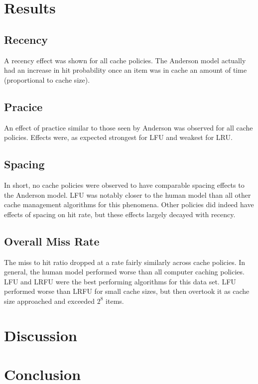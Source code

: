 \documentclass[10pt,letterpaper]{article}
\begin{document}
\section{Results}

\subsection{Recency}

A recency effect was shown for all cache policies. The Anderson model actually had an
increase in hit probability once an item was in cache an amount of time (proportional to cache size).

\subsection{Pracice}

An effect of practice similar to those seen by Anderson was observed for all cache policies.
Effects were, as expected strongest for LFU and weakest for LRU.

\subsection{Spacing}

In short, no cache policies were observed to have comparable spacing effects to the Anderson model. 
LFU was notably closer to the human model than all other cache management algorithms for this phenomena.
Other policies did indeed have effects of spacing on hit rate, but these effects largely decayed with recency.


\subsection{Overall Miss Rate}

The miss to hit ratio dropped at a rate fairly similarly across cache policies. In general, the human
model performed worse than all computer caching policies. LFU and LRFU were the best performing algorithms
for this data set. LFU performed worse than LRFU for small cache sizes, but then overtook it as cache 
size approached and exceeded $2^8$ items.

\section{Discussion}



\section{Conclusion}
\end{document}
